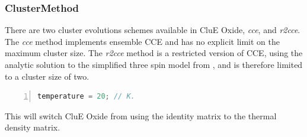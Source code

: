\documentclass{book}
\begin{document}
\subsubsection{ClusterMethod} %
There are two cluster evolutions schemes available in CluE Oxide, 
\textit{cce}, and \textit{r2cce}.
The \textit{cce} method implements ensemble CCE
\cite{2008_Yang_Liu,2009_Yang_Liu} and has no explicit limit on the maximum
cluster size.  
The \textit{r2cce} method is a restricted version of CCE, 
using the analytic solution to the simplified three spin model from
\cite{2006_Witzel_DasSarma}, and is therefore limited to a cluster size of two.

\begin{lstlisting}[frame=single,numbers=left,language=c]
temperature = 20; // K.
\end{lstlisting}
This will switch CluE Oxide from using the identity matrix to the thermal 
density matrix. 
\end{document}
